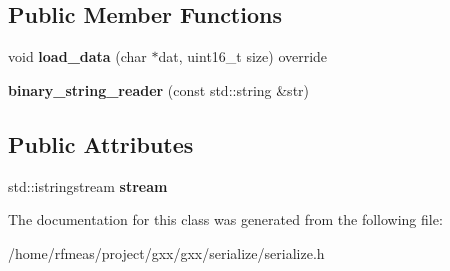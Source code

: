 \subsection*{Public Member Functions}
\begin{DoxyCompactItemize}
\item 
void {\bfseries load\+\_\+data} (char $\ast$dat, uint16\+\_\+t size) override\hypertarget{classgxx_1_1archive_1_1binary__string__reader_a581a1363185e7720c1bce91a49af42fe}{}\label{classgxx_1_1archive_1_1binary__string__reader_a581a1363185e7720c1bce91a49af42fe}

\item 
{\bfseries binary\+\_\+string\+\_\+reader} (const std\+::string \&str)\hypertarget{classgxx_1_1archive_1_1binary__string__reader_a3b71d311c3be2e6d68ca09991425c420}{}\label{classgxx_1_1archive_1_1binary__string__reader_a3b71d311c3be2e6d68ca09991425c420}

\end{DoxyCompactItemize}
\subsection*{Public Attributes}
\begin{DoxyCompactItemize}
\item 
std\+::istringstream {\bfseries stream}\hypertarget{classgxx_1_1archive_1_1binary__string__reader_a91e8cf3dcd508ab78708594277da462e}{}\label{classgxx_1_1archive_1_1binary__string__reader_a91e8cf3dcd508ab78708594277da462e}

\end{DoxyCompactItemize}


The documentation for this class was generated from the following file\+:\begin{DoxyCompactItemize}
\item 
/home/rfmeas/project/gxx/gxx/serialize/serialize.\+h\end{DoxyCompactItemize}
